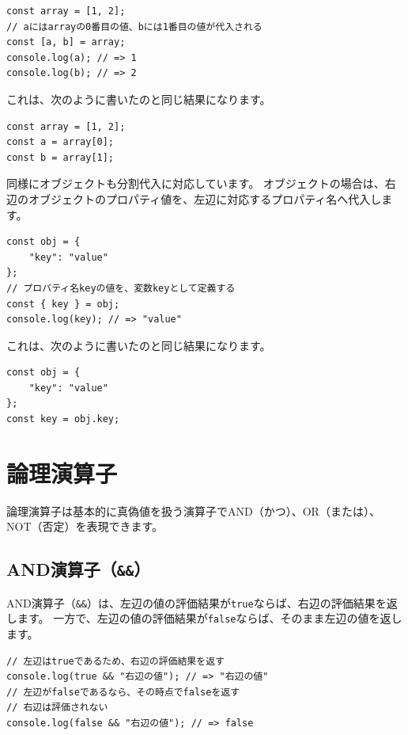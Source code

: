 \begin{lstlisting}
const array = [1, 2];
// aにはarrayの0番目の値、bには1番目の値が代入される
const [a, b] = array;
console.log(a); // => 1
console.log(b); // => 2
\end{lstlisting}

これは、次のように書いたのと同じ結果になります。

\begin{lstlisting}
const array = [1, 2];
const a = array[0];
const b = array[1];
\end{lstlisting}

同様にオブジェクトも分割代入に対応しています。
オブジェクトの場合は、右辺のオブジェクトのプロパティ値を、左辺に対応するプロパティ名へ代入します。

\begin{lstlisting}
const obj = {
    "key": "value"
};
// プロパティ名keyの値を、変数keyとして定義する
const { key } = obj;
console.log(key); // => "value"
\end{lstlisting}

これは、次のように書いたのと同じ結果になります。

\begin{lstlisting}
const obj = {
    "key": "value"
};
const key = obj.key;
\end{lstlisting}

\hypertarget{logical-operator}{%
\section{論理演算子}\label{logical-operator}}

論理演算子は基本的に真偽値を扱う演算子でAND（かつ）、OR（または）、NOT（否定）を表現できます。

\hypertarget{and-operator}{%
\subsection{AND演算子（\texttt{\&\&}）}\label{and-operator}}

AND演算子（\texttt{\&\&}）は、左辺の値の評価結果が\texttt{true}ならば、右辺の評価結果を返します。
一方で、左辺の値の評価結果が\texttt{false}ならば、そのまま左辺の値を返します。

\begin{lstlisting}
// 左辺はtrueであるため、右辺の評価結果を返す
console.log(true && "右辺の値"); // => "右辺の値"
// 左辺がfalseであるなら、その時点でfalseを返す
// 右辺は評価されない
console.log(false && "右辺の値"); // => false
\end{lstlisting}

